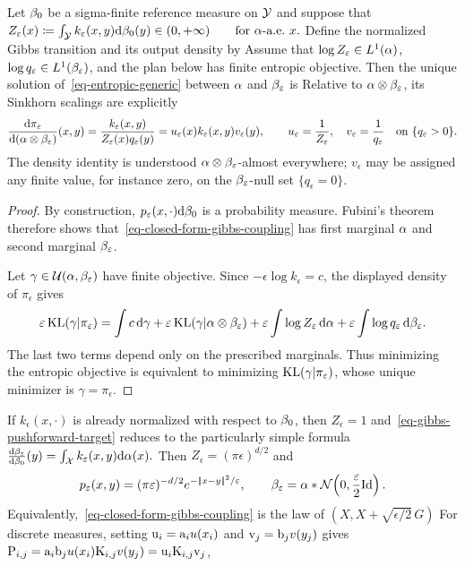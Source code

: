 \begin{prop}\label{prop-sinkhorn-gibbs-pushforward}
Let $\beta_0$ be a sigma-finite reference measure on $\mathcal{Y}$ and suppose that
\(Z_\epsilon(x)\eqdef\int_\Yy k_\epsilon(x,y)\d\be_0(y) \in(0,+\infty) \qquad\text{for $\al$-a.e.\ }x.\)
Define the normalized Gibbs transition and its output density by
Assume that $\log Z_\varepsilon\in L^1(\alpha)$, $\log q_\varepsilon\in L^1(\beta_\varepsilon)$, and the plan below has finite entropic objective. Then the unique solution of~\eqref{eq-entropic-generic} between $\alpha$ and $\beta_\varepsilon$ is
Relative to $\alpha\otimes\beta_\varepsilon$, its Sinkhorn scalings are explicitly
\[
\frac{\mathrm{d}\pi_\varepsilon}{\mathrm{d}(\alpha\otimes\beta_\varepsilon)}(x,y)
=
\frac{k_\varepsilon(x,y)}{Z_\varepsilon(x)q_\varepsilon(y)}
=
u_\varepsilon(x)k_\varepsilon(x,y)v_\varepsilon(y),
\qquad
u_\varepsilon=\frac1{Z_\varepsilon},
\quad
v_\varepsilon=\frac1{q_\varepsilon}
\quad\text{on }\{q_\varepsilon>0\}.
\]
The density identity is understood $\alpha\otimes\beta_\varepsilon$-almost everywhere; $v_\epsilon$ may be assigned any finite value, for instance zero, on the $\beta_\varepsilon$-null set $\{q_\epsilon=0\}$.
\end{prop}
\begin{proof}
By construction, $p_\varepsilon(x,\cdot)\mathrm{d}\beta_0$ is a probability measure. Fubini's theorem therefore shows that~\eqref{eq-closed-form-gibbs-coupling} has first marginal $\alpha$ and second marginal $\beta_\varepsilon$.

Let $\gamma\in\mathcal{U}(\alpha,\beta_\varepsilon)$ have finite objective. Since $-\epsilon\log k_\epsilon=c$, the displayed density of $\pi_\epsilon$ gives
\[
\varepsilon\operatorname{KL}(\gamma|\pi_\varepsilon)
=
\int c\,\mathrm{d}\gamma
+\varepsilon\operatorname{KL}(\gamma|\alpha\otimes\beta_\varepsilon)
+\varepsilon\int\log Z_\varepsilon\,\mathrm{d}\alpha
+\varepsilon\int\log q_\varepsilon\,\mathrm{d}\beta_\varepsilon.
\]
The last two terms depend only on the prescribed marginals. Thus minimizing the entropic objective is equivalent to minimizing $\operatorname{KL}(\gamma|\pi_\varepsilon)$, whose unique minimizer is $\gamma=\pi_\epsilon$.
\end{proof}
If $k_\epsilon(x,\cdot)$ is already normalized with respect to $\beta_0$, then $Z_\epsilon=1$ and~\eqref{eq-gibbs-pushforward-target} reduces to the particularly simple formula
\(\frac{\mathrm{d}\beta_\varepsilon}{\mathrm{d}\beta_0}(y) = \int_{\mathcal{X}} k_\varepsilon(x,y)\mathrm{d}\alpha(x).\)
Then $Z_\epsilon=(\pi\epsilon)^{d/2}$ and
\[
p_\varepsilon(x,y)
=
(\pi\varepsilon)^{-d/2}e^{-|\!| x-y |\!|^2/\varepsilon},
\qquad
\beta_\varepsilon
=
\alpha*\mathcal{N}\!\left(0,\frac{\varepsilon}{2}\mathrm{Id}\right).
\]
Equivalently,~\eqref{eq-closed-form-gibbs-coupling} is the law of
\(
(X,X+\sqrt{\epsilon/2}\,G)
\)
For discrete measures, setting $\mathrm{u}_i=\mathrm{a}_i u(x_i)$ and $\mathrm{v}_j=\mathrm{b}_j v(y_j)$ gives
\(
\mathrm{P}_{i,j}=\mathrm{a}_i\mathrm{b}_j u(x_i)\mathrm{K}_{i,j}v(y_j)=\mathrm{u}_i\mathrm{K}_{i,j}\mathrm{v}_j
\),
